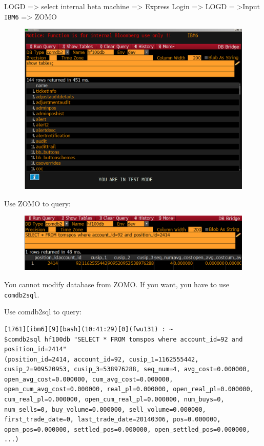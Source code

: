 \documentclass[8pt,]{article}
\begin{document}
LOGD =\textgreater{} select internal beta machine =\textgreater{}
Express Login =\textgreater{} LOGD = \textgreater{}Input \texttt{IBM6}
=\textgreater{} ZOMO

\begin{figure}[htbp]
\centering
\includegraphics{logd_zomo.png}
\caption{}
\end{figure}

Use ZOMO to query:

\begin{figure}[htbp]
\centering
\includegraphics{logd_zomo2.png}
\caption{}
\end{figure}

You cannot modify database from ZOMO. If you want, you have to use
\texttt{comdb2sql}.

Use comdb2sql to query:

\begin{verbatim}
[1761][ibm6][9][bash](10:41:29)[0](fwu131) : ~
$comdb2sql hf100db "SELECT * FROM tomspos where account_id=92 and position_id=2414"
(position_id=2414, account_id=92, cusip_1=1162555442, cusip_2=909520953, cusip_3=538976288, seq_num=4, avg_cost=0.000000, open_avg_cost=0.000000, cum_avg_cost=0.000000, open_cum_avg_cost=0.000000, real_pl=0.000000, open_real_pl=0.000000, cum_real_pl=0.000000, open_cum_real_pl=0.000000, num_buys=0, num_sells=0, buy_volume=0.000000, sell_volume=0.000000, first_trade_date=0, last_trade_date=20140306, pos=0.000000, open_pos=0.000000, settled_pos=0.000000, open_settled_pos=0.000000, ...)
\end{verbatim}
\end{document}
